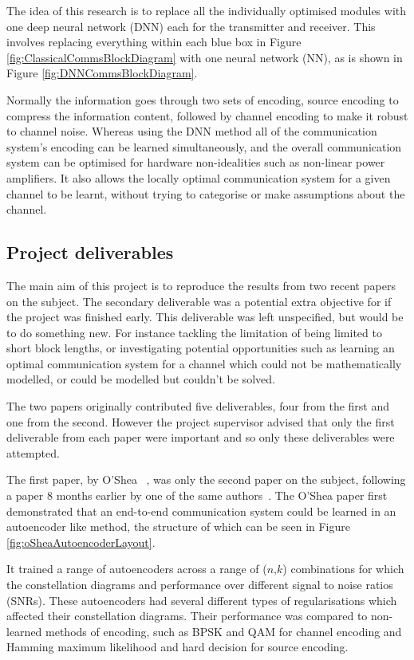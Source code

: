 \documentclass[12pt,onecolumn,letterpaper]{article}
\begin{document}
The idea of this research is to replace all the individually optimised modules with one deep neural network (DNN) each for the transmitter and receiver. This involves replacing everything within each blue box in Figure \ref{fig:ClassicalCommsBlockDiagram} with one neural network (NN), as is shown in Figure \ref{fig:DNNCommsBlockDiagram}. 

Normally the information goes through two sets of encoding, source encoding to compress the information content, followed by channel encoding to make it robust to channel noise. Whereas using the DNN method all of the communication system's encoding can be learned simultaneously, and the overall communication system can be optimised for hardware non-idealities such as non-linear power amplifiers. It also allows the locally optimal communication system for a given channel to be learnt, without trying to categorise or make assumptions about the channel.

\subsection{Project deliverables}

The main aim of this project is to reproduce the results from two recent papers ~\cite{oShea,Aoudia} on the subject. The secondary deliverable was a potential extra objective for if the project was finished early. This deliverable was left unspecified, but would be to do something new. For instance tackling the limitation of being limited to short block lengths, or investigating potential opportunities such as learning an optimal communication system for a channel which could not be mathematically modelled, or could be modelled but couldn't be solved.

The two papers originally contributed five deliverables, four from the first and one from the second. However the project supervisor advised that only the first deliverable from each paper were important and so only these deliverables were attempted. 

The first paper, by O'Shea \etal~\cite{oShea}, was only the second paper on the subject, following a paper 8 months earlier by one of the same authors~\cite{oShea0}. The O'Shea paper first demonstrated that an end-to-end communication system could be learned in an autoencoder like method, the structure of which can be seen in Figure \ref{fig:oSheaAutoencoderLayout}. 

It trained a range of autoencoders across a range of ($n$,$k$) combinations for which the constellation diagrams and performance over different signal to noise ratios (SNRs). These autoencoders had several different types of regularisations which affected their constellation diagrams. Their performance was compared to non-learned methods of encoding, such as BPSK and QAM for channel encoding and Hamming maximum likelihood and hard decision for source encoding. 
\end{document}
